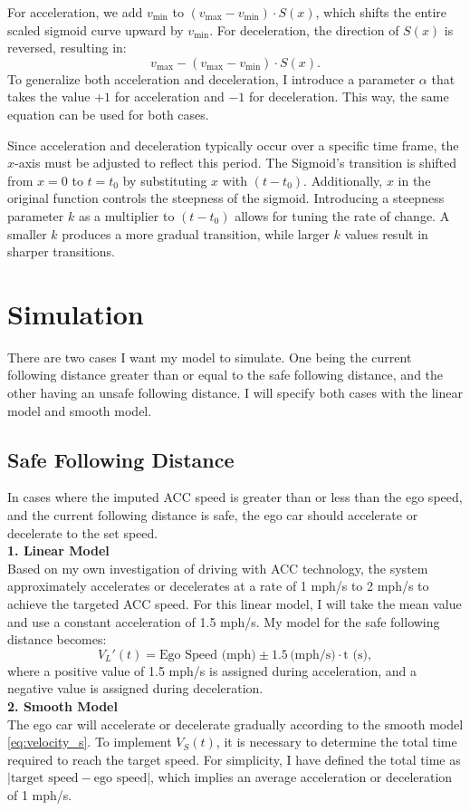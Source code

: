 \documentclass[12pt]{article}
\begin{document}
For acceleration, we add \( v_{\min} \) to \( (v_{\max} - v_{\min}) \cdot S(x) \), which shifts the entire scaled sigmoid curve upward by \( v_{\min} \). For deceleration, the direction of \( S(x) \) is reversed, resulting in:
\[
v_{\max} -(v_{\max} - v_{\min}) \cdot S(x).
\]
To generalize both acceleration and deceleration, I introduce a parameter \( \alpha \) that takes the value \( +1 \) for acceleration and \( -1 \) for deceleration. This way, the same equation can be used for both cases.

Since acceleration and deceleration typically occur over a specific time frame, the \( x \)-axis must be adjusted to reflect this period. The Sigmoid's transition is shifted from \( x = 0 \) to \( t = t_0 \) by substituting \( x \) with \( (t - t_0) \). Additionally, \( x \) in the original function controls the steepness of the sigmoid. Introducing a steepness parameter \( k \) as a multiplier to \( (t - t_0) \) allows for tuning the rate of change. A smaller \( k \) produces a more gradual transition, while larger \( k \) values result in sharper transitions.


\section*{Simulation}
There are two cases I want my model to simulate. One being the current following distance greater than or equal to the safe following distance, and the other having an unsafe following distance. I will specify both cases with the linear model and smooth model.

\subsection*{Safe Following Distance}
In cases where the imputed ACC speed is greater than or less than the ego speed, and the current following distance is safe, the ego car should accelerate or decelerate to the set speed.\vspace{1em} \\
\textbf{1. Linear Model} \\
\indent Based on my own investigation of driving with ACC technology, the system approximately accelerates or decelerates at a rate of 1 mph/s to 2 mph/s to achieve the targeted ACC speed. For this linear model, I will take the mean value and use a constant acceleration of 1.5 mph/s. My model for the safe following distance becomes:
\[
V_L'(t) = \text{Ego Speed (mph)} \pm 1.5 \, \text{(mph/s)} \cdot \text{t (s)},
\]
where a positive value of 1.5 mph/s is assigned during acceleration, and a negative value is assigned during deceleration.\vspace{1em} \\
\textbf{2. Smooth Model} \\
\indent The ego car will accelerate or decelerate gradually according to the smooth model \eqref{eq:velocity_s}. To implement \( V_S(t) \), it is necessary to determine the total time required to reach the target speed. For simplicity, I have defined the total time as \( | \text{target speed} - \text{ego speed} | \), which implies an average acceleration or deceleration of 1 mph/s.
\end{document}
